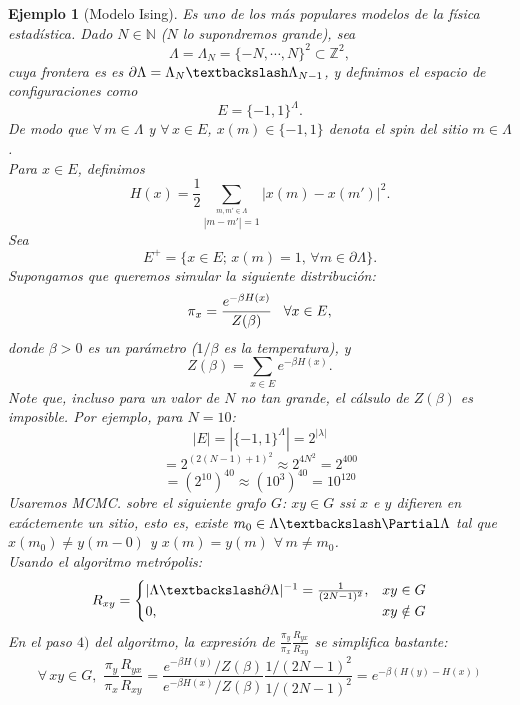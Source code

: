 \documentclass[a4paper]{article}
\newtheorem{ejemplo}{Ejemplo}
\numberwithin{equation}{subsection}
\numberwithin{definicion}{subsection}
\def\N{\mathbb N}
\def\Z{\mathbb Z}
\begin{document}
\begin{ejemplo}[Modelo Ising]
Es uno de los más populares modelos de la física estadística. Dado $N\in \N$ ($N$ lo supondremos grande), sea 
\[\Lambda = \Lambda_N = \{-N,\cdots,N\}^2 \subset \Z^2,\]
cuya frontera es es $\partial \Lambda =\Lambda_N \textbackslash \Lambda_{N-1}$, y definimos el \textit{espacio de configuraciones} como
\[E = \{-1,1\}^{\Lambda}.\]
De modo que $\forall\,m\in \Lambda$ y $\forall\,x\in E$, $x(m)\in \{-1,1\}$ denota el \textit{spin} del sitio $m\in \Lambda$.\\
Para $x\in E$, definimos 
\[H(x) = \frac{1}{2}\sum_{\overset{m,m'\in\Lambda}{|m-m'|=1} }|x(m)-x(m')|^2.\]
Sea
\[E^{+} = \{x \in E;\,x(m)=1,\,\forall m \in \partial \Lambda\}.\]
Supongamos que queremos simular la siguiente distribución:
\[\pi_x = \frac{e^{-\beta H(x)}}{Z(\beta)}\hspace{0.3cm}\forall x\in E,\]
donde $\beta >0$ es un parámetro ($1/\beta$ es la temperatura), y 
\[Z(\beta) = \sum_{x\in E}e^{-\beta H(x)}.\]
Note que, incluso para un valor de $N$ no tan grande, el cálsulo de $Z(\beta)$ es imposible. Por ejemplo, para $N=10$:
\[|E| = |\{-1,1\}^{\Lambda}| = 2^{|\lambda|}\]
\[= 2^{(2(N-1)+1)^2} \approx 2^{4N^2} = 2^{ 400}\]
\[=(2^{10})^{40} \approx (10^3)^{40} = 10^{120}\]
Usaremos MCMC. sobre el siguiente grafo $G$: $xy \in G$ ssi $x$ e $y$ difieren en exáctemente un sitio, esto es, existe $m_0 \in \Lambda \textbackslash \Partial \Lambda$ tal que $x(m_0) \neq y(m-0)$ y $x(m)=y(m)$ $\forall\,m\neq m_0$.\\
Usando el algoritmo metrópolis:
\[R_{xy} = \begin{cases}
|\Lambda \textbackslash \partial \Lambda |^{-1} = \frac{1}{(2N-1)^2}, & xy\in G\\
0, & xy \notin G
\end{cases}\]
En el paso $4)$ del algoritmo, la expresión de $\frac{\pi_y}{\pi_x}\frac{R_{yx}}{R_{xy}}$ se simplifica bastante:
\[\forall\,xy\in G,\,\,\frac{\pi_y}{\pi_x}\frac{R_{yx}}{R_{xy}} = \frac{e^{-\beta H(y)}/Z(\beta)}{e^{-\beta H(x)}/Z(\beta)} \frac{1/(2N-1)^{2}}{1/(2N-1)^{2}} = e^{-\beta(H(y)-H(x))}\]
\end{ejemplo}
\end{document}
